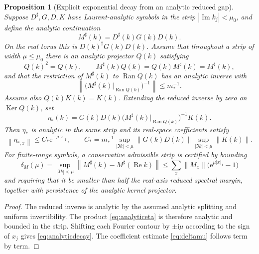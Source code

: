 \documentclass[11pt]{article}
\newtheorem{proposition}[theorem]{Proposition}
\theoremstyle{definition}
\theoremstyle{remark}
\newcommand{\Ran}{\operatorname{Ran}}
\newcommand{\Ker}{\operatorname{Ker}}
\newcommand{\I}{\mathrm i}
\newcommand{\e}{\mathrm e}
\newcommand{\norm}[1]{\left\lVert #1\right\rVert}
\newcommand{\abs}[1]{\left\lvert #1\right\rvert}
\begin{document}
\begin{proposition}[Explicit exponential decay from an analytic reduced gap]
\label{prop:analyticgap}
Suppose $D^\sharp,G,D,K$ have Laurent-analytic symbols in the strip
$\abs{\operatorname{Im}k_j}<\mu_0$, and define the analytic continuation
\begin{equation}
 M^\sharp(k)=D^\sharp(k)G(k)D(k).
 \label{eq:Msharp}
\end{equation}
On the real torus this is $D(k)^\dagger G(k)D(k)$.  Assume that throughout a strip of width $\mu\le\mu_0$ there is an analytic projector $Q(k)$ satisfying
\begin{equation}
 Q(k)^2=Q(k),
 \qquad
 M^\sharp(k)Q(k)=Q(k)M^\sharp(k)=M^\sharp(k),
 \label{eq:analyticQ}
\end{equation}
and that the restriction of $M^\sharp(k)$ to $\Ran Q(k)$ has an analytic inverse with
\begin{equation}
 \norm{\bigl(M^\sharp(k)|_{\Ran Q(k)}\bigr)^{-1}}\le m_*^{-1}.
 \label{eq:reducedgap}
\end{equation}
Assume also $Q(k)K(k)=K(k)$.  Extending the reduced inverse by zero on $\Ker Q(k)$, set
\begin{equation}
 \eta_*(k)=G(k)D(k)\bigl(M^\sharp(k)|_{\Ran Q(k)}\bigr)^{-1}K(k).
 \label{eq:analyticeta}
\end{equation}
Then $\eta_*$ is analytic in the same strip and its real-space coefficients satisfy
\begin{equation}
 \boxed{
 \norm{\eta_{*,x}}
 \le C_*\e^{-\mu\abs{x}_1},
 \qquad
 C_*=m_*^{-1}
 \sup_{\abs{\Im k}<\mu}\norm{G(k)D(k)}
 \sup_{\abs{\Im k}<\mu}\norm{K(k)}.}
 \label{eq:analyticdecay}
\end{equation}
For finite-range symbols, a conservative admissible strip is certified by bounding
\begin{equation}
 \delta_M(\mu)
 =\sup_{\abs{\Im k}<\mu}
 \norm{M^\sharp(k)-M^\sharp(\operatorname{Re}k)}
 \le\sum_x\norm{M_x}\bigl(\e^{\mu\abs x_1}-1\bigr)
 \label{eq:deltamu}
\end{equation}
and requiring that it be smaller than half the real-axis reduced spectral margin, together with persistence of the analytic kernel projector.
\end{proposition}

\begin{proof}
The reduced inverse is analytic by the assumed analytic splitting and uniform invertibility.  The product \eqref{eq:analyticeta} is therefore analytic and bounded in the strip.  Shifting each Fourier contour by $\pm\I\mu$ according to the sign of $x_j$ gives \eqref{eq:analyticdecay}.  The coefficient estimate \eqref{eq:deltamu} follows term by term.
\end{proof}
\end{document}
